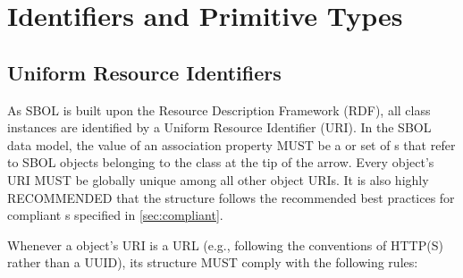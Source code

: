 

\section{Identifiers and Primitive Types}

\subsection{Uniform Resource Identifiers}
\label{sec:URIstructure}

As SBOL is built upon the Resource Description Framework (RDF), all class instances are identified by a Uniform Resource Identifier (URI).  In the SBOL data model, the value of an association property MUST be a  or set of s that refer to SBOL objects belonging to the class at the tip of the arrow.  Every  object's URI MUST be globally unique among all other  object URIs. It is also highly RECOMMENDED that the  structure follows the recommended best practices for compliant s specified in \ref{sec:compliant}.

Whenever a  object's URI is a URL (e.g., following the conventions of HTTP(S) rather than a UUID), its structure MUST comply with the following rules:

